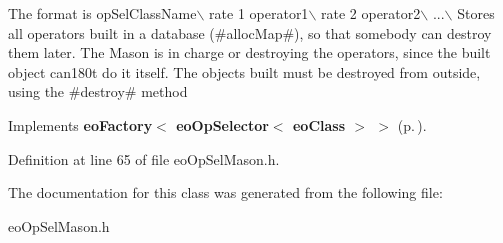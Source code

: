 The format is op\-Sel\-Class\-Name$\backslash$ rate 1 operator1$\backslash$ rate 2 operator2$\backslash$ ...$\backslash$ Stores all operators built in a database (\#alloc\-Map\#), so that somebody can destroy them later. The Mason is in charge or destroying the operators, since the built object can180t do it itself. The objects built must be destroyed from outside, using the \#destroy\# method

Implements {\bf eo\-Factory$<$ eo\-Op\-Selector$<$ eo\-Class $>$ $>$} {\rm (p.\,\pageref{classeo_factory_a0})}.

Definition at line 65 of file eo\-Op\-Sel\-Mason.h.

The documentation for this class was generated from the following file:\begin{CompactItemize}
\item 
eo\-Op\-Sel\-Mason.h\end{CompactItemize}

